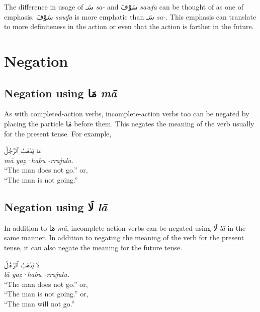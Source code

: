 \documentclass[
  10pt,
]{book}
\begin{document}
The difference in usage of \foreignlanguage{arabic}{سَـ} \emph{sa-} and \foreignlanguage{arabic}{سَوْفَ} \emph{sawfa} can be thought of as one of emphasis. \foreignlanguage{arabic}{سَوْفَ} \emph{sawfa} is more emphatic than \foreignlanguage{arabic}{سَـ} \emph{sa-}. This emphasis can translate to more definiteness in the action or even that the action is farther in the future.

\section{Negation}\label{negation}

\subsection{\texorpdfstring{Negation using \foreignlanguage{arabic}{مَا} \emph{mā}}{Negation using مَا mā}}\label{negation-using-ux645ux627-ma}

As with completed-action verbs, incomplete-action verbs too can be negated by placing the particle \foreignlanguage{arabic}{مَا} before them. This negates the meaning of the verb usually for the present tense. For example,

\foreignlanguage{arabic}{مَا يَذْهَبُ ٱلرَّجُلُ}\\
\emph{mā yaẕ·habu -rrajulu.}\\
\enquote{The man does not go.} or,\\
\enquote{The man is not going.}

\subsection{\texorpdfstring{Negation using \foreignlanguage{arabic}{لَا} \emph{lā}}{Negation using لَا lā}}\label{u-state-verb-negation-la}

In addition to \foreignlanguage{arabic}{مَا} \emph{mā}, incomplete-action verbs can be negated using \foreignlanguage{arabic}{لَا} \emph{lā} in the same manner. In addition to negating the meaning of the verb for the present tense, it can also negate the meaning for the future tense.

\foreignlanguage{arabic}{لَا يَذْهَبُ ٱلرَّجُلُ}\\
\emph{lā yaẕ·habu -rrajulu.}\\
\enquote{The man does not go.} or,\\
\enquote{The man is not going.} or,\\
\enquote{The man will not go.}
\end{document}
